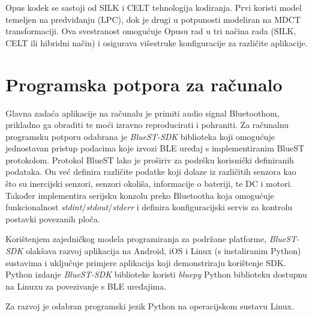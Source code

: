 Opus kodek se sastoji od SILK i CELT tehnologija kodiranja. Prvi koristi model temeljen na predviđanju (LPC), dok je drugi u potpunosti modeliran na MDCT transformaciji. Ova svestranost omogućuje Opusu rad u tri načina rada (SILK, CELT ili hibridni način) i osigurava višestruke konfiguracije za različite aplikacije.

\section{Programska potpora za računalo}

Glavna zadaća aplikacije na računalu je primiti audio signal Bluetoothom, prikladno ga obraditi te moći izravno reproducirati i pohraniti. Za računalnu programsku potporu odabrana je \textit{BlueST-SDK} biblioteka koji omogućuje jednostavan pristup podacima koje izvozi BLE uređaj s implementiranim BlueST protokolom. Protokol BlueST lako je proširiv za podršku korisnički definiranih podataka. On već definira različite podatke koji dolaze iz različitih senzora kao što su inercijski senzori, senzori okoliša, informacije o bateriji, te DC i motori. Također implementira serijsku konzolu preko Bluetootha koja omogućuje funkcionalnost \textit{stdint}/\textit{stdout}/\textit{stderr} i definira konfiguracijski servis za kontrolu postavki povezanih ploča. 

Korištenjem zajedničkog modela programiranja za podržane platforme, \textit{BlueST-SDK} olakšava razvoj aplikacija na Android, iOS i Linux (s instaliranim Python) sustavima i uključuje primjere aplikacija koji demonstriraju korištenje SDK. Python izdanje \textit{BlueST-SDK} biblioteke koristi \textit{bluepy} Python biblioteku dostupnu na Linuxu za povezivanje s BLE uređajima.

Za razvoj je odabran programski jezik Python na operacijskom sustavu Linux. 

